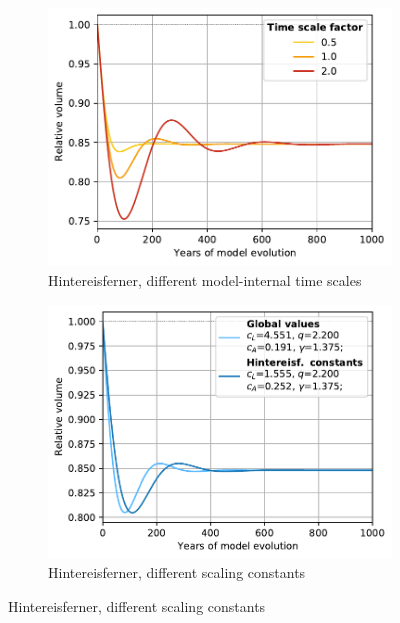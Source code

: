     \begin{figure}[ht]
      \centering
      \begin{subfigure}[b]{0.476\textwidth}
        \caption{Hintereisferner, different model-internal time scales}
        \label{fig:sensitivity:time_scales_hef}
        \centering
        \includegraphics[width=\textwidth]{../plots/final_plots/sensitivity/time_scales_hef.pdf}
      \end{subfigure}
      \hfill
      \begin{subfigure}[b]{0.476\textwidth}
        \caption{Hintereisferner, different scaling constants}
        \label{fig:sensitivity:scaling_params_hef}
        \centering
        \includegraphics[width=\textwidth]{../plots/final_plots/sensitivity/scaling_params_hef.pdf}
      \end{subfigure}
      

\end{figure}
